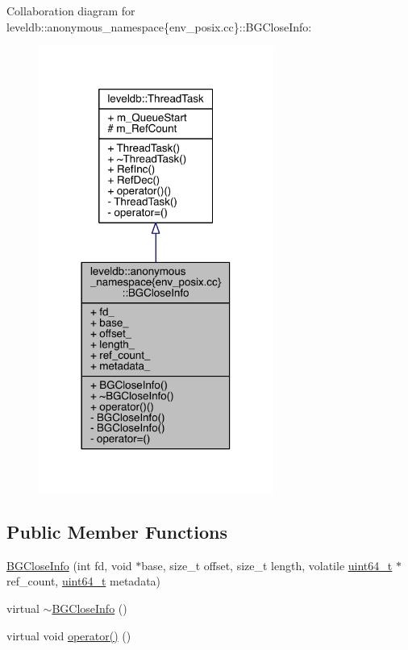 Collaboration diagram for leveldb\+:\+:anonymous\+\_\+namespace\{env\+\_\+posix.\+cc\}\+:\+:B\+G\+Close\+Info\+:
\nopagebreak
\begin{figure}[H]
\begin{center}
\leavevmode
\includegraphics[width=218pt]{classleveldb_1_1anonymous__namespace_02env__posix_8cc_03_1_1_b_g_close_info__coll__graph}
\end{center}
\end{figure}
\subsection*{Public Member Functions}
\begin{DoxyCompactItemize}
\item 
\hyperlink{classleveldb_1_1anonymous__namespace_02env__posix_8cc_03_1_1_b_g_close_info_aa5ce8558719ba8eb04b251cb17aa2778}{B\+G\+Close\+Info} (int fd, void $\ast$base, size\+\_\+t offset, size\+\_\+t length, volatile \hyperlink{stdint_8h_aaa5d1cd013383c889537491c3cfd9aad}{uint64\+\_\+t} $\ast$ref\+\_\+count, \hyperlink{stdint_8h_aaa5d1cd013383c889537491c3cfd9aad}{uint64\+\_\+t} metadata)
\item 
virtual \hyperlink{classleveldb_1_1anonymous__namespace_02env__posix_8cc_03_1_1_b_g_close_info_a8cfc076bfa292ccef355616889742af0}{$\sim$\+B\+G\+Close\+Info} ()
\item 
virtual void \hyperlink{classleveldb_1_1anonymous__namespace_02env__posix_8cc_03_1_1_b_g_close_info_ac9267307a99c588777902ce3e7e28845}{operator()} ()
\end{DoxyCompactItemize}
